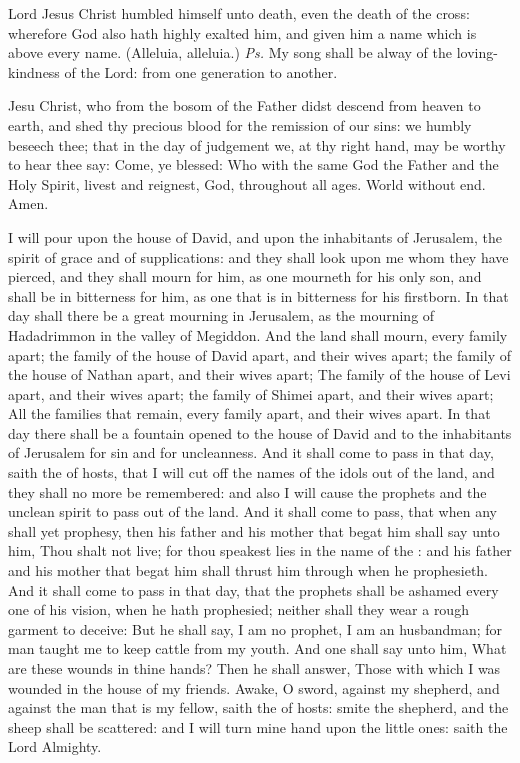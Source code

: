\introit
{} Lord Jesus Christ humbled himself unto death, even the death of the cross: wherefore God also hath highly exalted him, and given him a name which is above every name. (Alleluia, alleluia.) \textit{Ps.} My song shall be alway of the loving-kindness of the Lord: from one generation to another.

\collect
{} Jesu Christ, who from the bosom of the Father didst descend from heaven to earth, and shed thy precious blood for the remission of our sins: we humbly beseech thee; that in the day of judgement we, at thy right hand, may be worthy to hear thee say: Come, ye blessed: Who with the same God the Father and the Holy Spirit, livest and reignest, God, throughout all ages. World without end. Amen.

 I will pour upon the house of David, and upon the inhabitants of Jerusalem, the spirit of grace and of supplications: and they shall look upon me whom they have pierced, and they shall mourn for him, as one mourneth for his only son, and shall be in bitterness for him, as one that is in bitterness for his firstborn. In that day shall there be a great mourning in Jerusalem, as the mourning of Hadadrimmon in the valley of Megiddon. And the land shall mourn, every family apart; the family of the house of David apart, and their wives apart; the family of the house of Nathan apart, and their wives apart; The family of the house of Levi apart, and their wives apart; the family of Shimei apart, and their wives apart; All the families that remain, every family apart, and their wives apart. In that day there shall be a fountain opened to the house of David and to the inhabitants of Jerusalem for sin and for uncleanness. And it shall come to pass in that day, saith the  of hosts, that I will cut off the names of the idols out of the land, and they shall no more be remembered: and also I will cause the prophets and the unclean spirit to pass out of the land. And it shall come to pass, that when any shall yet prophesy, then his father and his mother that begat him shall say unto him, Thou shalt not live; for thou speakest lies in the name of the : and his father and his mother that begat him shall thrust him through when he prophesieth. And it shall come to pass in that day, that the prophets shall be ashamed every one of his vision, when he hath prophesied; neither shall they wear a rough garment to deceive: But he shall say, I am no prophet, I am an husbandman; for man taught me to keep cattle from my youth. And one shall say unto him, What are these wounds in thine hands? Then he shall answer, Those with which I was wounded in the house of my friends. Awake, O sword, against my shepherd, and against the man that is my fellow, saith the  of hosts: smite the shepherd, and the sheep shall be scattered: and I will turn mine hand upon the little ones: saith the Lord Almighty.

